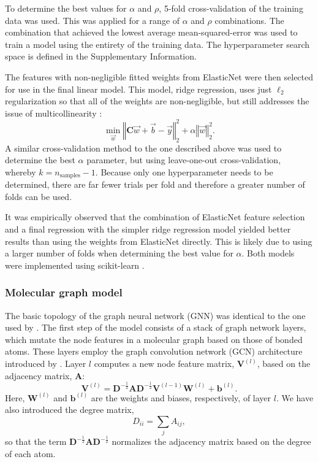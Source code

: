 To determine the best values for $\alpha$ and $\rho$, 5-fold cross-validation of
the training data was used. This was applied for a range of $\alpha$ and $\rho$
combinations. The combination that achieved the lowest average
mean-squared-error was used to train a model using the entirety of the training
data. The hyperparameter search space is defined in the Supplementary
Information.

The features with non-negligible fitted weights from ElasticNet were then
selected for use in the final linear model. This model, ridge regression, uses
just $\ell_2$ regularization so that all of the weights are non-negligible, but
still addresses the issue of multicollinearity
\cite{mcdonaldRidgeRegression2009}:
\begin{equation}
    \min_{\vec{w}} \left \Vert \mathbf{C} \vec{w} + \vec{b} - \vec{y} \right \Vert_2^2 + \alpha \left \Vert \vec{w}\right \Vert_2^2.
\end{equation}
A similar cross-validation method to the one described above was used to
determine the best $\alpha$ parameter, but using leave-one-out cross-validation,
whereby $k=n_\text{samples}-1$. Because only one hyperparameter needs to be
determined, there are far fewer trials per fold and therefore a greater number
of folds can be used.

It was empirically observed that the combination of ElasticNet feature selection
and a final regression with the simpler ridge regression model yielded better
results than using the weights from ElasticNet directly. This is likely due to
using a larger number of folds when determining the best value for $\alpha$.
Both models were implemented using scikit-learn
\cite{pedregosaScikitlearnMachineLearning2011}.

\subsubsection{Molecular graph model}

The basic topology of the graph neural network (GNN) was identical to the one
used by \citet{qinPredictingCriticalMicelle2021}. The first step of the model
consists of a stack of graph network layers, which mutate the node features in a
molecular graph based on those of bonded atoms. These layers employ the graph
convolution network (GCN) architecture introduced by
\citet{kipfSemiSupervisedClassificationGraph2017}. Layer $l$ computes a new node
feature matrix, $\mathbf{V}^{(l)}$, based on the adjacency matrix, $\mathbf{A}$:
\begin{equation}
    \mathbf{V}^{(l)} = \mathbf{D}^{-\frac{1}{2}} \mathbf{A} \mathbf{D}^{-\frac{1}{2}} \mathbf{V}^{(l-1)} \mathbf{W}^{(l)} + \mathbf{b}^{(l)}.
\end{equation}
Here, $\mathbf{W}^{(l)}$ and $\mathbf{b}^{(l)}$ are the weights and biases,
respectively, of layer $l$. We have also introduced the degree matrix,
\begin{equation}
    D_{ii} = \sum_j A_{ij},
\end{equation}
so that the term $\mathbf{D}^{-\frac{1}{2}} \mathbf{A} \mathbf{D}^{-\frac{1}{2}}$ normalizes the
    adjacency matrix based on the degree of each atom.


